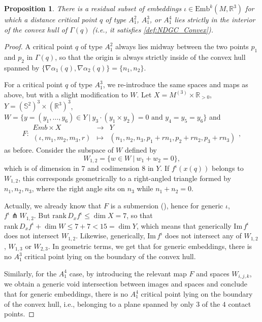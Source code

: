 \documentclass[11pt]{article}
\newcommand{\R}{\mathbb{R}}
\newcommand{\io}{\iota}
\newcommand{\Emb}{\mathrm{Emb}^k(M,\R^3)}
\newcommand{\grad}{\nabla}
\renewcommand{\Im}{\mathrm{Im} \,}
\newcommand{\rank}{\mathrm{rank} \,}
\theoremstyle{plain}
\newtheorem{prop}{Proposition}
\theoremstyle{definition}
\theoremstyle{remark}
\begin{document}
\begin{prop}	\label{prop:A1_convex hull}
There is a residual subset of embeddings $\iota \in \Emb$ for which a distance critical point $q$ of type $A_1^2$, $A_1^3$, or $A_1^4$ lies strictly in the interior of the convex hull of $\Gamma(q)$ (i.e., it satisfies \ref{def:NDGC_Convex}).
\end{prop}

\begin{proof}
A critical point $q$ of type $A_1^2$ always lies midway between the two points $p_1$ and $p_2$ in $\Gamma(q)$, so that the origin is always strictly inside of the convex hull spanned by $\{\grad \alpha_1(q), \grad \alpha_2(q)\} = \{n_1, n_2\}$.

For a critical point $q$ of type $A_1^3$, we re-introduce the same spaces and maps as above, but with a slight modification to $W$.
Let $X = M^{(3)} \times \R_{>0}$, $Y = (\mathbb{S}^2)^3 \times (\R^3)^3$, $W = \{y = (y_1,\ldots, y_6)\in Y ~|~ y_3 \cdot (y_1 \times y_2) = 0 \text{ and } y_4 = y_5 = y_6 \}$ and
\begin{equation*}
	F:
	\begin{array}{ccc}
		Emb \times X & \to & Y \\
		(\io, m_1,m_2,m_3,r) & \mapsto & (n_1, n_2, n_3, p_1 + r n_1, p_2 + r n_2 , p_3 + r n_3)
	\end{array},
\end{equation*} 
as before. Consider the subspace of $W$ defined by
\[W_{1,2} = \{ w \in W ~|~ w_1 + w_2 = 0 \},\]
which is of dimension in $7$ and codimension $8$ in $Y$. If $f^\io(x(q))$ belongs to $W_{1,2}$, this corresponds geometrically to a right-angled triangle formed by $n_1,n_2,n_3$, where the right angle sits on $n_3$ while $n_1 + n_2 = 0$. 

Actually, we already know that $F$ is a submersion (), hence for generic $\io$, $f^\io \pitchfork W_{1,2}$. But $\rank D_x f^\io \leq \dim X = 7$, so that $\rank D_x f^\io + \dim W \leq 7 + 7 < 15 = \dim Y$,
which means that generically $\Im f^\io$ does not intersect $W_{1,2}$. Likewise, generically, $\Im f^\io$ does not intersect any of $W_{1,2}$, $W_{1,3}$ or $W_{2,3}$. In geometric terms, we get that for generic embeddings, there is no $A_1^3$ critical point lying on the boundary of the convex hull.

Similarly, for the $A_1^4$ case, by introducing the relevant map $F$ and spaces $W_{i,j,k}$, we obtain a generic void intersection between images and spaces and conclude that for generic embeddings, there is no $A_1^4$ critical point lying on the boundary of the convex hull, i.e., belonging to a plane spanned by only $3$ of the $4$ contact points.
  \end{proof}
\end{document}
